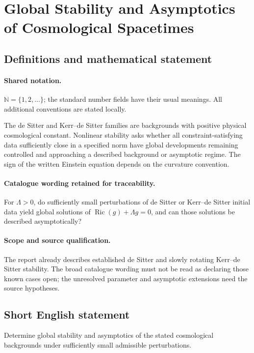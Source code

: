 \documentclass[11pt]{article}
\begin{document}
\section{Global Stability and Asymptotics of Cosmological Spacetimes}\label{statement}

\subsection{Definitions and mathematical statement}

\paragraph{Shared notation.}$\mathbb N=\{1,2,\ldots\}$; the standard number fields have their usual meanings. All additional conventions are stated locally.


The de Sitter and Kerr--de Sitter families are backgrounds with positive physical cosmological constant. Nonlinear stability asks whether all constraint-satisfying data sufficiently close in a specified norm have global developments remaining controlled and approaching a described background or asymptotic regime. The sign of the written Einstein equation depends on the curvature convention.

\paragraph{Catalogue wording retained for traceability.}
For $\Lambda>0$, do sufficiently small perturbations of de Sitter or Kerr–de Sitter initial data yield global solutions of $\operatorname{Ric}(g)+\Lambda g=0$, and can those solutions be described asymptotically?

\paragraph{Scope and source qualification.}The report already describes established de Sitter and slowly rotating Kerr--de Sitter stability. The broad catalogue wording must not be read as declaring those known cases open; the unresolved parameter and asymptotic extensions need the source hypotheses.
\subsection{Short English statement}
Determine global stability and asymptotics of the stated cosmological backgrounds under sufficiently small admissible perturbations.
\end{document}
